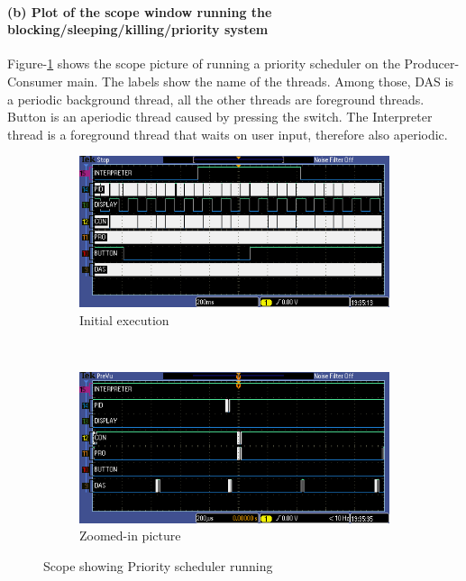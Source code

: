 \documentclass[a4paper]{article}
\newlength{\pic}
\begin{document}
\paragraph{(b) Plot of the scope window running the blocking/sleeping/killing/priority system \\}

Figure-\ref{PRI} shows the scope picture of running a priority scheduler on the Producer-Consumer main.
The labels show the name of the threads. Among those, DAS is a periodic background thread, all the other threads
are foreground threads. Button is an aperiodic thread caused by pressing the switch. The Interpreter thread is
a foreground thread that waits on user input, therefore also aperiodic.

\setlength{\pic}{0.8\textwidth}

\begin{figure}[htp]
\center
	\begin{subfigure}[H]{\pic}
	\includegraphics[width=\pic]{Scope/Pri}
	\caption{Initial execution}
	\end{subfigure}
	\\[5pt]
	\begin{subfigure}[H]{\pic}
	\includegraphics[width=\pic]{Scope/Pri_zoom}
	\caption{Zoomed-in picture}
	\end{subfigure}
\caption{Scope showing Priority scheduler running}
\label{PRI}
\end{figure}
\end{document}
